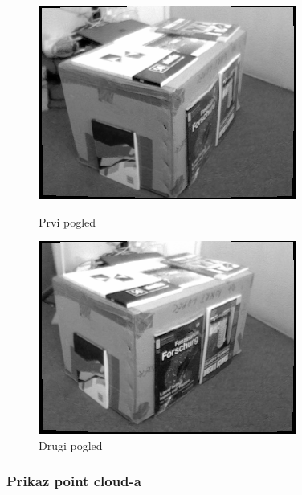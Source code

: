 \begin{figure}[h]
\centering
\begin{minipage}{.5\textwidth}
  \centering
  \includegraphics[width=.9\linewidth]{images/lab5-image1.png}
  \caption{Prvi pogled}
  \label{fig:lab5-image1}
\end{minipage}%
\begin{minipage}{.5\textwidth}
  \centering
  \includegraphics[width=.9\linewidth]{images/lab5-image2.png}
  \caption{Drugi pogled}
  \label{fig:lab5-image2}
\end{minipage}
\end{figure}

\newpage
\subsubsection{Prikaz point cloud-a}

